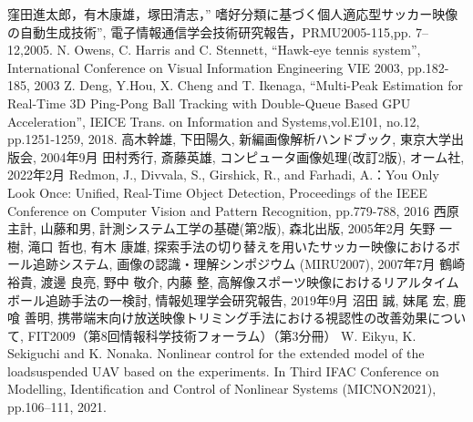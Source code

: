 \documentclass[11pt,a4j]{jreport}
\begin{document}
\renewcommand{\bibname}{参考文献} %


\begin{thebibliography}{99}
     窪田進太郎，有木康雄，塚田清志，” 嗜好分類に基づく個人適応型サッカー映像の自動生成技術”, 電子情報通信学会技術研究報告，PRMU2005-115,pp. 7–12,2005.
     N. Owens, C. Harris and C. Stennett, “Hawk-eye tennis system”, International Conference on Visual Information Engineering VIE 2003, pp.182-185, 2003
      Z. Deng, Y.Hou, X. Cheng and T. Ikenaga, “Multi-Peak Estimation for Real-Time 3D Ping-Pong Ball Tracking with Double-Queue Based GPU Acceleration”, IEICE Trans. on Information and Systems,vol.E101, no.12, pp.1251-1259, 2018.
     高木幹雄, 下田陽久, 新編画像解析ハンドブック, 東京大学出版会, 2004年9月
     田村秀行, 斎藤英雄, コンピュータ画像処理(改訂2版), オーム社, 2022年2月
     Redmon, J., Divvala, S., Girshick, R., and Farhadi, A.：You Only Look Once: Unified, Real-Time Object Detection, Proceedings of the IEEE Conference on Computer Vision and Pattern Recognition, pp.779-788, 2016
     西原主計, 山藤和男, 計測システム工学の基礎(第2版), 森北出版, 2005年2月
     矢野 一樹, 滝口 哲也, 有木 康雄, 探索手法の切り替えを用いたサッカー映像におけるボール追跡システム, 画像の認識・理解シンポジウム (MIRU2007), 2007年7月
     鶴崎 裕貴, 渡邊 良亮, 野中 敬介, 内藤 整, 高解像スポーツ映像におけるリアルタイムボール追跡手法の一検討, 情報処理学会研究報告, 2019年9月
     沼田 誠, 妹尾 宏, 鹿喰 善明, 携帯端末向け放送映像トリミング手法における視認性の改善効果について, FIT2009（第8回情報科学技術フォーラム）（第3分冊）
     W. Eikyu, K. Sekiguchi and K. Nonaka. Nonlinear control for the extended model of the loadsuspended UAV based on the experiments. In Third IFAC Conference on Modelling, Identification and Control of Nonlinear Systems (MICNON2021), pp.106–111, 2021.
\end{thebibliography}
\end{document}
